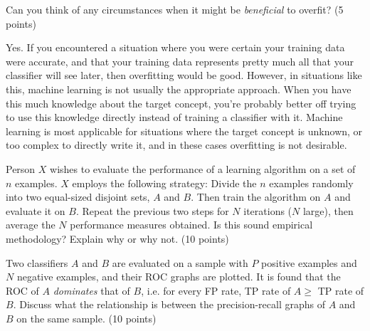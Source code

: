 \documentclass[fleqn]{homework}
\begin{document}
  \maketitle

  \begin{problem}{1}
    \begin{question}
      Can you think of any circumstances when it might be \textit{beneficial} to
      overfit? (5 points)
    \end{question}

    Yes.  If you encountered a situation where you were certain your training
    data were accurate, and that your training data represents pretty much all
    that your classifier will see later, then overfitting would be good.
    However, in situations like this, machine learning is not usually the
    appropriate approach.  When you have this much knowledge about the target
    concept, you're probably better off trying to use this knowledge directly
    instead of training a classifier with it.  Machine learning is most
    applicable for situations where the target concept is unknown, or too
    complex to directly write it, and in these cases overfitting is not
    desirable.
  \end{problem}

  \begin{problem}{2}
    \begin{question}
      Person $X$ wishes to evaluate the performance of a learning algorithm on a
      set of $n$ examples.  $X$ employs the following strategy: Divide the $n$
      examples randomly into two equal-sized disjoint sets, $A$ and $B$.  Then
      train the algorithm on $A$ and evaluate it on $B$.  Repeat the previous
      two steps for $N$ iterations ($N$ large), then average the $N$ performance
      measures obtained.  Is this sound empirical methodology?  Explain why or
      why not. (10 points)
    \end{question}
  \end{problem}

  \begin{problem}{3}
    \begin{question}
      Two classifiers $A$ and $B$ are evaluated on a sample with $P$ positive
      examples and $N$ negative examples, and their ROC graphs are plotted.  It
      is found that the ROC of $A$ \textit{dominates} that of $B$, i.e. for
      every FP rate, TP rate of $A \ge$ TP rate of $B$.  Discuss what the
      relationship is between the precision-recall graphs of $A$ and $B$ on the
      same sample. (10 points)
    \end{question}
  \end{problem}
\end{document}
